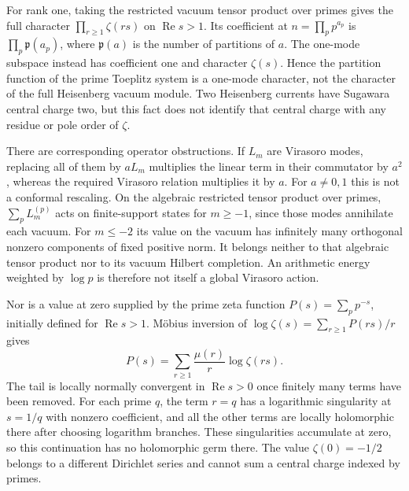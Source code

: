 For rank one, taking the restricted vacuum tensor product over primes gives
the full character $\prod_{r\geq1}\zeta(rs)$ on $\operatorname{Re}s>1$.
Its coefficient at $n=\prod_pp^{a_p}$ is
$\prod_p\mathfrak p(a_p)$, where $\mathfrak p(a)$ is the number of partitions
of $a$.  The one-mode subspace instead has coefficient one and character
$\zeta(s)$.  Hence the partition function of the prime Toeplitz system is a
one-mode character, not the character of the full Heisenberg vacuum module.
Two Heisenberg currents have Sugawara central charge two, but this fact does
not identify that central charge with any residue or pole order of $\zeta$.

There are corresponding operator obstructions.  If $L_m$ are Virasoro modes,
replacing all of them by $aL_m$ multiplies the linear term in their commutator
by $a^2$, whereas the required Virasoro relation multiplies it by $a$.
For $a\ne0,1$ this is not a conformal rescaling.
On the algebraic restricted tensor product over primes, $\sum_pL_m^{(p)}$
acts on finite-support states for $m\geq-1$, since those modes annihilate each
vacuum.  For $m\leq-2$ its value on the vacuum has infinitely many orthogonal
nonzero components of fixed positive norm.  It belongs neither to that
algebraic tensor product nor to its vacuum Hilbert completion.
An arithmetic energy weighted by $\log p$ is therefore not itself a global
Virasoro action.

Nor is a value at zero supplied by the prime zeta function
$P(s)=\sum_pp^{-s}$, initially defined for $\operatorname{Re}s>1$.
M\"obius inversion of $\log\zeta(s)=\sum_{r\geq1}P(rs)/r$ gives
\[
 P(s)=\sum_{r\geq1}\frac{\mu(r)}r\log\zeta(rs).
\]
The tail is locally normally convergent in $\operatorname{Re}s>0$ once
finitely many terms have been removed.  For each prime $q$, the term $r=q$
has a logarithmic singularity at $s=1/q$ with nonzero coefficient, and
all the other terms are locally holomorphic there after choosing logarithm
branches.  These singularities accumulate at zero, so this continuation
has no holomorphic germ there.  The value $\zeta(0)=-1/2$ belongs to a
different Dirichlet series and cannot sum a central charge indexed by primes.

